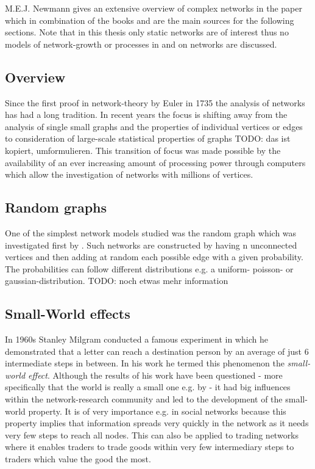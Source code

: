 \documentclass[../Bachelorarbeit.tex]{subfiles}
\begin{document}
M.E.J. Newmann gives an extensive overview of complex networks in the paper \cite{Newman_ComplexNetworks} which in combination of the books \cite{Jackson2008} and \cite{Easley2010} are the main sources for the following sections. Note that in this thesis only static networks are of interest thus no models of network-growth or processes in and on networks are discussed.

\subsection{Overview}
Since the first proof in network-theory by Euler in 1735 the analysis of networks has had a long tradition. In recent years the focus is shifting away from the analysis of single small graphs and the properties of individual vertices or edges to consideration of large-scale statistical properties of graphs TODO: das ist kopiert, umformulieren. This transition of focus was made possible by the availability of an ever increasing amount of processing power through computers which allow the investigation of networks with millions of vertices.

\subsection{Random graphs}
One of the simplest network models studied was the random graph which was investigated first by \cite{ErdosRenyi_RandomGraphs}. Such networks are constructed by having n unconnected vertices and then adding at random each possible edge with a given probability. The probabilities can follow different distributions e.g. a uniform- poisson- or gaussian-distribution. TODO: noch etwas mehr information

\subsection{Small-World effects}
In 1960s Stanley Milgram conducted a famous experiment in which he demonstrated that a letter can reach a destination person by an average of just 6 intermediate steps in between. In his work \cite{TraverMilgram_StudySmallWorld} \cite{Milgram_SmallWorld} he termed this phenomenon the \textit{small-world effect}. Although the results of his work have been questioned - more specifically that the world is really a small one e.g. by \cite{Kleinfeld_BigWorld} - it had big influences within the network-research community and led to the development of the small-world property. It is of very importance e.g. in social networks because this property implies that information spreads very quickly in the network as it needs very few steps to reach all nodes. This can also be applied to trading networks where it enables traders to trade goods within very few intermediary steps to traders which value the good the most.
\end{document}
